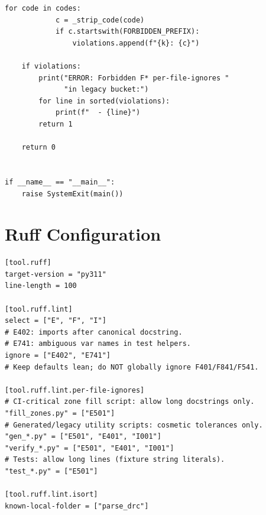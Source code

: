 \documentclass[11pt,a4paper]{article}
\begin{document}
\begin{lstlisting}[caption={\texttt{ci\_lint\_policy.py} (158 lines).},label={lst:policy-full}]
        for code in codes:
            c = _strip_code(code)
            if c.startswith(FORBIDDEN_PREFIX):
                violations.append(f"{k}: {c}")

    if violations:
        print("ERROR: Forbidden F* per-file-ignores "
              "in legacy bucket:")
        for line in sorted(violations):
            print(f"  - {line}")
        return 1

    return 0


if __name__ == "__main__":
    raise SystemExit(main())
\end{lstlisting}

\section{Ruff Configuration}
\label{app:ruff}

\begin{lstlisting}[style=tomlstyle,caption={\texttt{pyproject.toml} (23 lines).},label={lst:pyproject-full}]
[tool.ruff]
target-version = "py311"
line-length = 100

[tool.ruff.lint]
select = ["E", "F", "I"]
# E402: imports after canonical docstring.
# E741: ambiguous var names in test helpers.
ignore = ["E402", "E741"]
# Keep defaults lean; do NOT globally ignore F401/F841/F541.

[tool.ruff.lint.per-file-ignores]
# CI-critical zone fill script: allow long docstrings only.
"fill_zones.py" = ["E501"]
# Generated/legacy utility scripts: cosmetic tolerances only.
"gen_*.py" = ["E501", "E401", "I001"]
"verify_*.py" = ["E501", "E401", "I001"]
# Tests: allow long lines (fixture string literals).
"test_*.py" = ["E501"]

[tool.ruff.lint.isort]
known-local-folder = ["parse_drc"]
\end{lstlisting}
\end{document}
